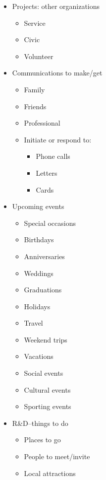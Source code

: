 \documentclass[10pt,landscape]{article}
\begin{document}
\begin{multicols}{3}
\begin{itemize}
\begin{itemize}
\end{itemize}

\item Projects: other organizations \begin{itemize}
\item Service 
\item Civic 
\item Volunteer 

\end{itemize}

\item Communications to make/get \begin{itemize}
\item Family 
\item Friends 
\item Professional 
\item Initiate or respond to: \begin{itemize}
\item Phone calls 
\item Letters 
\item Cards 

\end{itemize}


\end{itemize}

\item Upcoming events \begin{itemize}
\item Special occasions 
\item Birthdays 
\item Anniversaries 
\item Weddings 
\item Graduations 
\item Holidays 
\item Travel 
\item Weekend trips 
\item Vacations 
\item Social events 
\item Cultural events 
\item Sporting events 

\end{itemize}

\item R\&D--things to do \begin{itemize}
\item Places to go 
\item People to meet/invite 
\item Local attractions 


\end{itemize}
\end{itemize}
\end{multicols}
\end{document}
